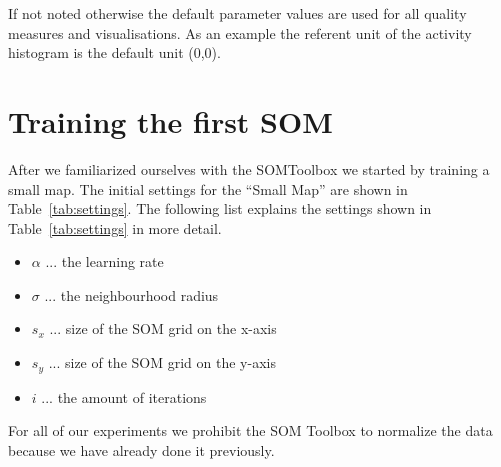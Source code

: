 \documentclass{acm_proc_article-sp}
\begin{document}
If not noted otherwise the default parameter values are used for all quality measures and visualisations.
As an example the referent unit of the activity histogram is the default unit (0,0).

\section{Training the first SOM}

After we familiarized ourselves with the SOMToolbox we started by training a small
map. The initial settings for the ``Small Map'' are shown in Table~\ref{tab:settings}. 
The following list explains the settings shown in Table~\ref{tab:settings} in more detail.

\begin{itemize}
    \item $\alpha$ ... the learning rate
    \item $\sigma$ ... the neighbourhood radius
    \item $s_x$ ... size of the SOM grid on the x-axis
    \item $s_y$ ... size of the SOM grid on the y-axis
    \item $i$ ... the amount of iterations
\end{itemize}

For all of our experiments we prohibit the SOM Toolbox to normalize the data because we have
already done it previously.
\end{document}
